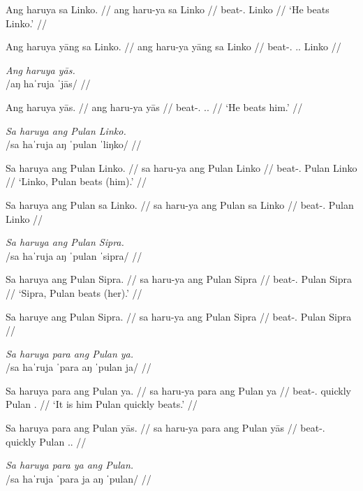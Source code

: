 \documentclass[12pt,a4paper]{scrartcl}
\newcommand{\TsgM}{{\Tsg}.{\M}}
\newcommand{\TsgF}{{\Tsg}.{\F}}
\begin{document}
\gla Ang haruya sa Linko. //
\glb ang haru-ya sa Linko //
\glc \AgtT{} beat-\TsgM{} \Parg{} Linko //
\glft `He beats Linko.' //
\endgl

\a\ljudge*\begingl
\gla Ang haruya yāng sa Linko. //
\glb ang haru-ya yāng sa Linko //
\glc \AgtT{} beat-\TsgM{} \TsgM{}.\Aarg{} \Parg{} Linko //
\endgl
\xe

\ex\begingl
\glpreamble \textit{Ang haruya yās.}\\
	/aŋ haˈruja ˈjās/ //

\gla Ang haruya yās. //
\glb ang haru-ya yās //
\glc \AgtT{} beat-\TsgM{} \TsgM{}.\Parg{} //
\glft `He beats him.' //
\endgl\xe

\pex
\a\begingl
\glpreamble \textit{Sa haruya ang Pulan Linko.} \\
	/sa haˈruja aŋ ˈpulan ˈliŋko/ //

\gla Sa haruya ang Pulan Linko. //
\glb sa haru-ya ang Pulan Linko //
\glc \PatT{} beat-\TsgM{} \Aarg{} Pulan Linko //
\glft `Linko, Pulan beats (him).' //
\endgl

\a\ljudge*\begingl
\gla Sa haruya ang Pulan sa Linko. //
\glb sa haru-ya ang Pulan sa Linko //
\glc \PatT{} beat-\TsgM{} \Aarg{} Pulan \Parg{} Linko //
\endgl\xe

\pex
\a\begingl
\glpreamble \textit{Sa haruya ang Pulan Sipra.} \\
	/sa haˈruja aŋ ˈpulan ˈsipra/ //

\gla Sa haruya ang Pulan Sipra. //
\glb sa haru-ya ang Pulan Sipra //
\glc \PatT{} beat-\TsgM{} \Aarg{} Pulan Sipra //
\glft `Sipra, Pulan beats (her).' //
\endgl

\a\ljudge*\begingl
\gla Sa haruye ang Pulan Sipra. //
\glb sa haru-ya ang Pulan Sipra //
\glc \PatT{} beat-\TsgF{} \Aarg{} Pulan Sipra //
\endgl\xe

\pex
\a\begingl
\glpreamble \textit{Sa haruya para ang Pulan ya.} \\
	/sa haˈruja ˈpara aŋ ˈpulan ja/ //

\gla Sa haruya para ang Pulan ya. //
\glb sa haru-ya para ang Pulan ya //
\glc \PatT{} beat-\TsgM{} quickly \Aarg{} Pulan \TsgM{} //
\glft `It is him Pulan quickly beats.' //
\endgl

\a\ljudge*\begingl
\gla Sa haruya para ang Pulan yās. //
\glb sa haru-ya para ang Pulan yās //
\glc \PatT{} beat-\TsgM{} quickly \Aarg{} Pulan \TsgM{}.\Parg{} //
\endgl\xe

\ex\begingl
\glpreamble \textit{Sa haruya para ya ang Pulan.}\\
	/sa haˈruja ˈpara ja aŋ ˈpulan/ //
\end{document}
